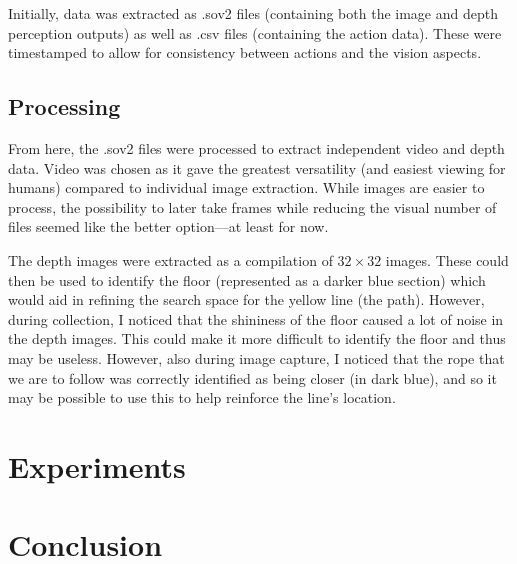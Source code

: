 \documentclass[12pt]{article}
\begin{document}
Initially, data was extracted as .sov2 files (containing both the image and depth perception
outputs) as well as .csv files (containing the action data). These were timestamped to 
allow for consistency between actions and the vision aspects.

\subsection{Processing}
From here, the .sov2 files were processed to extract independent video and depth data. Video
was chosen as it gave the greatest versatility (and easiest viewing for humans) compared
to individual image extraction. While images are easier to process, the possibility to later
take frames while reducing the visual number of files seemed like the better option---at least
for now.

The depth images were extracted as a compilation of $32 \times 32$ images. These could
then be used to identify the floor (represented as a darker blue section) which would aid in
refining the search space for the yellow line (the path). However, during collection, I
noticed that the shininess of the floor caused a lot of noise in the depth images. This could
make it more difficult to identify the floor and thus may be useless. However, also during
image capture, I noticed that the rope that we are to follow was correctly identified as
being closer (in dark blue), and so it may be possible to use this to help reinforce the
line's location.

\section{Experiments}

\section{Conclusion}
\end{document}
